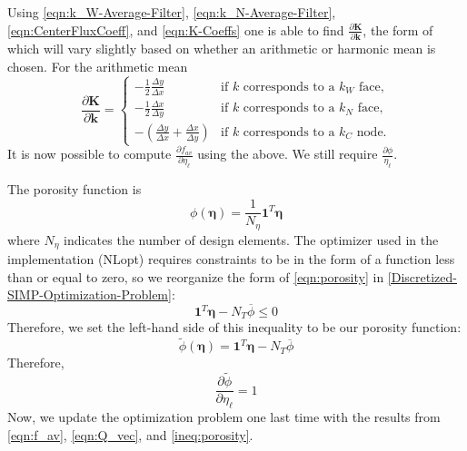 Using \eqref{eqn:k_W-Average-Filter}, \eqref{eqn:k_N-Average-Filter}, \eqref{eqn:CenterFluxCoeff}, and \eqref{eqn:K-Coeffs} one is able to find $\frac{\partial\mathbf{K}}{\partial\mathbf{k}}$, the form of which will vary slightly based on whether an arithmetic or harmonic mean is chosen. For the arithmetic mean
\begin{equation}
	\frac{\partial\mathbf{K}}{\partial\mathbf{k}}=
	\begin{cases}
		-\frac{1}{2}\frac{\Delta y}{\Delta x} & \text{if }k\text{ corresponds to a }k_W\text{ face},\\
		-\frac{1}{2}\frac{\Delta x}{\Delta y} & \text{if }k\text{ corresponds to a }k_N\text{ face},\\
		-\left(\frac{\Delta y}{\Delta x}+\frac{\Delta x}{\Delta y}\right) & \text{if }k\text{ corresponds to a }k_C\text{ node}.
	\end{cases}
\end{equation}
It is now possible to compute $\displaystyle\frac{\partial f_{av}}{\partial\eta_{\ell}}$ using the above. We still require $\displaystyle\frac{\partial\phi}{\eta_{\ell}}$.

The porosity function is
\begin{equation}
	\phi(\boldsymbol{\eta})=\frac{1}{N_\eta}\mathbf{1}^T\boldsymbol{\eta}\label{eqn:porosity}
\end{equation}
where $N_\eta$ indicates the number of design elements. The optimizer used in the implementation (NLopt) requires constraints to be in the form of a function less than or equal to zero, so we reorganize the form of \eqref{eqn:porosity} in \eqref{Discretized-SIMP-Optimization-Problem}:
\begin{equation}
	\mathbf{1}^T\boldsymbol{\eta}-N_{T}\overline{\phi}\leq 0\label{ineq:porosity}
\end{equation}
Therefore, we set the left-hand side of this inequality to be our porosity function:
\begin{equation}
	\tilde{\phi}\left(\boldsymbol{\eta}\right)=\mathbf{1}^T\boldsymbol{\eta}-N_T\overline{\phi}\label{eqn:modified-porosity}
\end{equation}
Therefore,
\begin{equation}
	\frac{\partial\tilde{\phi}}{\partial\eta_{\ell}}=1\label{eqn:partial-por}
\end{equation}
Now, we update the optimization problem one last time with the results from \eqref{eqn:f_av}, \eqref{eqn:Q_vec}, and \eqref{ineq:porosity}.

